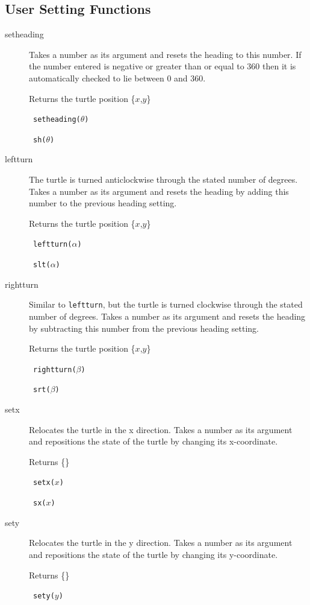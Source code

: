 \subsection{User Setting Functions}
\begin{description}
 \item[setheading] Takes a number as its argument and resets the heading
       to this number. If the number entered is negative or greater than
       or equal to 360 then it is automatically checked to lie between 0
       and 360.

       Returns the turtle position \{$x$,$y$\}

       \syntax\ {\tt setheading($\theta$)}

       \abb\ {\tt sh($\theta$)}
 \item[leftturn]  The turtle is turned anticlockwise through the
       stated number of degrees. Takes a number as its argument and
       resets the heading by adding this number to the previous heading
       setting.

       Returns the turtle position \{$x$,$y$\}

       \syntax\ {\tt leftturn($\alpha$)}

       \abb\ {\tt slt($\alpha$)}
 \item[rightturn] Similar to {\tt leftturn}, but the turtle is turned
       clockwise through the stated number of degrees. Takes a number as
       its argument and resets the heading by subtracting this number from
       the previous heading setting.

       Returns the turtle position \{$x$,$y$\}

       \syntax\ {\tt rightturn($\beta$)}

       \abb\ {\tt srt($\beta$)}
 \item[setx] Relocates the turtle in the x direction. Takes a number as
       its argument and repositions the state of the turtle by changing its
       x-coordinate.

       Returns \{\}

       \syntax\ {\tt setx($x$)}

       \abb\ {\tt sx($x$)}
 \item[sety] Relocates the turtle in the y direction. Takes a number as   
       its argument and repositions the state of the turtle by changing its
       y-coordinate.

       Returns \{\}

       \syntax\ {\tt sety($y$)}


\end{description}
